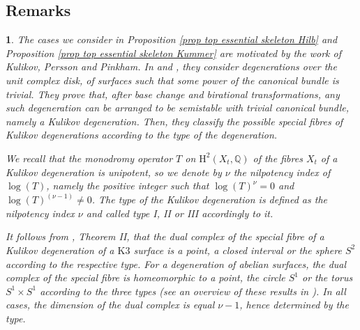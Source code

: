 \documentclass{amsart}%
\numberwithin{equation}{subsection}
\theoremstyle{plain2}
\theoremstyle{definition2}
\theoremstyle{stepstyle}
\theoremstyle{point}
\theoremstyle{subpoint}
\newtheorem{subpoint}[equation]{}%
\newcommand{\spa}[1]{\begin{subpoint}#1\end{subpoint}}           %
\newcommand{\Q}{\ensuremath{\mathbb{Q}}}
\begin{document}
\subsection{Remarks}
\spa{The cases we consider in Proposition \ref{prop top essential skeleton Hilb} and Proposition \ref{prop top essential skeleton Kummer} are motivated by the work of Kulikov, Persson and Pinkham. In \cite{Kulikov} and \cite{PerssonPinkham1981}, they consider degenerations  over the unit complex disk, of surfaces such that some power of the canonical bundle is trivial. They prove that, after base change and birational transformations, any such degeneration can be arranged to be semistable with trivial canonical bundle, namely a \emph{Kulikov degeneration}. Then, they classify the possible special fibres of Kulikov degenerations according to the type of the degeneration.

We recall that the monodromy operator $T$ on $\text{H}^2(X_t, \Q)$ of the fibres $X_t$ of a Kulikov degeneration is unipotent, so we denote by $\nu$ the nilpotency index of $\log(T)$, namely the positive integer such that $\log(T)^\nu=0$ and $\log(T)^{(\nu-1)} \neq 0$. The type of the Kulikov degeneration is defined as the nilpotency index $\nu$ and called type I, II or III accordingly to it.

It follows from \cite{Kulikov}, Theorem II, that the dual complex of the special fibre of a Kulikov degeneration of a $\text{K}3$ surface is a point, a closed interval or the sphere $S^2$ according to the respective type. For a degeneration of abelian surfaces, the dual complex of the special fibre is homeomorphic to a point, the circle $S^1$ or the torus $S^1 \times S^1$ according to the three types (see an overview of these results in \cite{FriedmanMorrison}). In all cases, the dimension of the dual complex is equal $\nu-1$, hence determined by the type.
}
\end{document}
